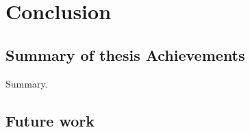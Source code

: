 \chapter{Conclusion}
\label{chap:conclusion}

\section{Summary of thesis Achievements}

Summary.

\section{Future work}